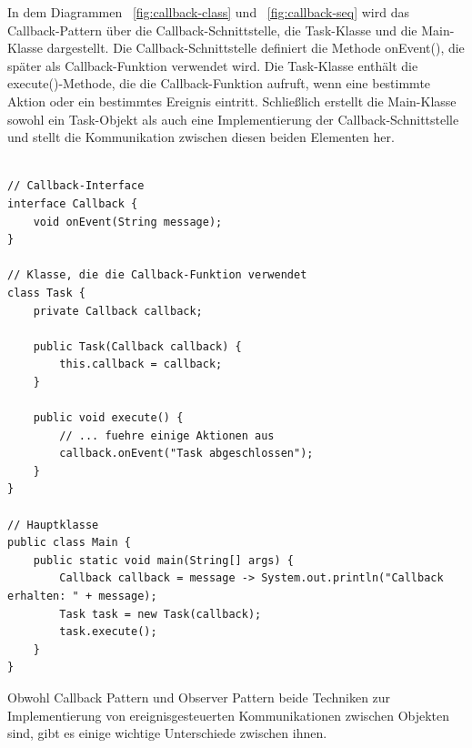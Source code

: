 In dem Diagrammen ~\ref{fig:callback-class} und ~\ref{fig:callback-seq} wird das Callback-Pattern über die Callback-Schnittstelle, die Task-Klasse und die Main-Klasse dargestellt. Die Callback-Schnittstelle definiert die Methode onEvent(), die später als Callback-Funktion verwendet wird. Die Task-Klasse enthält die execute()-Methode, die die Callback-Funktion aufruft, wenn eine bestimmte Aktion oder ein bestimmtes Ereignis eintritt. Schließlich erstellt die Main-Klasse sowohl ein Task-Objekt als auch eine Implementierung der Callback-Schnittstelle und stellt die Kommunikation zwischen diesen beiden Elementen her.\\\\

\noindent\begin{minipage}{\textwidth}
\begin{lstlisting}[caption={Callback Pattern},captionpos=b,label={lst:callback}]
// Callback-Interface
interface Callback {
    void onEvent(String message);
}

// Klasse, die die Callback-Funktion verwendet
class Task {
    private Callback callback;

    public Task(Callback callback) {
        this.callback = callback;
    }

    public void execute() {
        // ... fuehre einige Aktionen aus
        callback.onEvent("Task abgeschlossen");
    }
}

// Hauptklasse
public class Main {
    public static void main(String[] args) {
        Callback callback = message -> System.out.println("Callback erhalten: " + message);
        Task task = new Task(callback);
        task.execute();
    }
}
\end{lstlisting}
\end{minipage}
Obwohl Callback Pattern und Observer Pattern beide Techniken zur Implementierung von ereignisgesteuerten Kommunikationen zwischen Objekten sind, gibt es einige wichtige Unterschiede zwischen ihnen.

